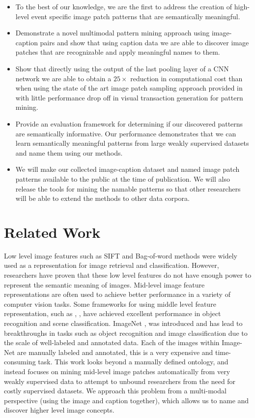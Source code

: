 \documentclass[10pt,twocolumn,letterpaper]{article}
\begin{document}
\begin{itemize}
\item To the best of our knowledge, we are the first to address the creation of high-level event specific image patch patterns that are semantically meaningful.
\item Demonstrate a novel multimodal pattern mining approach using image-caption pairs and show that using caption data we are able to discover image patches that are recognizable and apply meaningful names to them.
\item Show that directly using the output of the last pooling layer of a CNN network we are able to obtain a $25\times$ reduction in computational cost than when using the state of the art image patch sampling approach provided in \cite{LiLSH15CVPR} with little performance drop off in visual transaction generation for pattern mining.
\item Provide an evaluation framework for determining if our discovered patterns are semantically informative.
Our performance demonstrates that we can learn semantically meaningful patterns from large weakly supervised datasets and name them using our methods.
\item We will make our collected image-caption dataset and named image patch patterns available to the public at the time of publication. We will also release the tools for mining the namable patterns so that other researchers will be able to extend the methods to other data corpora.
\end{itemize}

\section{Related Work}
Low level image features such as SIFT \cite{Lowe:2004:DIF:993451.996342} and Bag-of-word methods were widely used as a representation for image retrieval and classification.
However, researchers have proven that these low level features do not have enough power to represent the semantic meaning of images.
Mid-level image feature representations are often used to achieve better performance in a variety of computer vision tasks.
Some frameworks for using middle level feature representation, such as \cite{li2010object}, \cite{TorresaniSzummerFitzgibbon10}, have achieved excellent performance in object recognition and scene classification.
ImageNet \cite{deng2009imagenet}, was introduced and has lead to breakthroughs in tasks such as object recognition and image classification due to the scale of well-labeled and annotated data.
Each of the images within Image-Net are manually labeled and annotated, this is a very expensive and time-consuming task.
This work looks beyond a manually defined ontology, and instead focuses on mining mid-level image patches automatically from very weakly supervised data to attempt to unbound researchers from the need for costly supervised datasets.
We approach this problem from a multi-modal perspective (using the image and caption together), which allows us to name and discover higher level image concepts.
\end{document}
